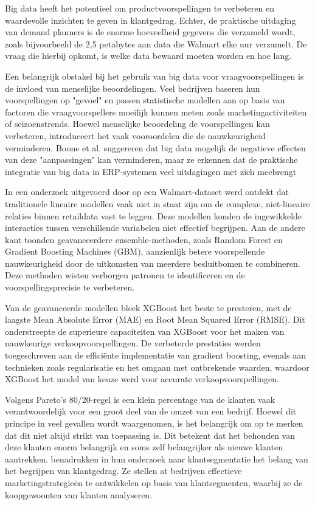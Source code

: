 Big data heeft het potentieel om productvoorspellingen te verbeteren en waardevolle inzichten te geven in klantgedrag. Echter, de praktische uitdaging van demand planners is de enorme hoeveelheid gegevens die verzameld wordt, zoals bijvoorbeeld de 2,5 petabytes aan data die Walmart elke uur verzamelt. De vraag die hierbij opkomt, is welke data bewaard moeten worden en hoe lang. 

Een belangrijk obstakel bij het gebruik van big data voor vraagvoorspellingen is de invloed van menselijke beoordelingen. Veel bedrijven baseren hun voorspellingen op "gevoel" en passen statistische modellen aan op basis van factoren die vraagvoorspellers moeilijk kunnen meten zoals marketingactiviteiten of seizoenstrends. Hoewel menselijke beoordeling de voorspellingen kan verbeteren, introduceert het vaak vooroordelen die de nauwkeurigheid verminderen. Boone et al. suggereren dat big data mogelijk de negatieve effecten van deze "aanpassingen" kan verminderen, maar ze erkennen dat de praktische integratie van big data in ERP-systemen veel uitdagingen met zich meebrengt





In een onderzoek uitgevoerd door \textcite{Neba2024}  op een Walmart-dataset werd ontdekt dat traditionele lineaire modellen vaak niet in staat zijn om de complexe, niet-lineaire relaties binnen retaildata vast te leggen. Deze modellen konden de ingewikkelde interacties tussen verschillende variabelen niet effectief begrijpen. Aan de andere kant toonden geavanceerdere ensemble-methoden, zoals Random Forest en Gradient Boosting Machines (GBM), aanzienlijk betere voorspellende nauwkeurigheid door de uitkomsten van meerdere besluitbomen te combineren. Deze methoden wisten verborgen patronen te identificeren en de voorspellingsprecisie te verbeteren.

Van de geavanceerde modellen bleek XGBoost het beste te presteren, met de laagste Mean Absolute Error (MAE) en Root Mean Squared Error (RMSE). Dit onderstreepte de superieure capaciteiten van XGBoost voor het maken van nauwkeurige verkoopvoorspellingen. De verbeterde prestaties werden toegeschreven aan de efficiënte implementatie van gradient boosting, evenals aan technieken zoals regularisatie en het omgaan met ontbrekende waarden, waardoor XGBoost het model van keuze werd voor accurate verkoopvoorspellingen.


Volgens Pareto’s 80/20-regel is een klein percentage van de klanten vaak verantwoordelijk voor een groot deel van de omzet van een bedrijf. Hoewel dit principe in veel gevallen wordt waargenomen, is het belangrijk om op te merken dat dit niet altijd strikt van toepassing is. Dit betekent dat het behouden van deze klanten enorm belangrijk en soms zelf belangrijker als nieuwe klanten aantrekken. \textcite{Wu2011} benadrukken in hun onderzoek naar klantsegmentatie het belang van het begrijpen van klantgedrag. Ze stellen at bedrijven effectieve marketingstrategieën te ontwikkelen op basis van klantsegmenten, waarbij ze de koopgewoonten van klanten analyseren. 

